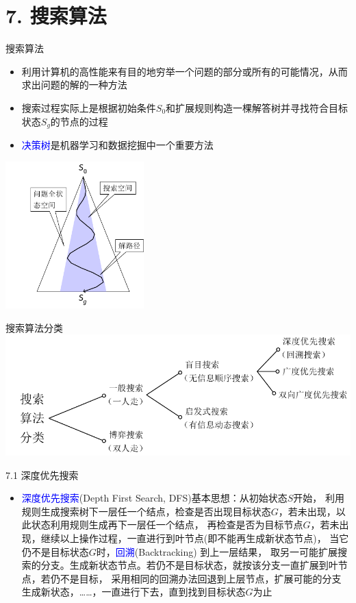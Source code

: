 


\frame{\titlepage}
\section{7. 搜索算法}
\begin{frame}{搜索算法}
    \begin{itemize}
        \item 利用计算机的高性能来有目的地穷举一个问题的部分或所有的可能情况，从而求出问题的解的一种方法
        \item 搜索过程实际上是根据初始条件$S_0$和扩展规则构造一棵解答树并寻找符合目标状态$S_g$的节点的过程
        \item \textcolor{blue}{决策树}是机器学习和数据挖掘中一个重要方法
    \end{itemize}
    \includegraphics[width=0.4\textwidth,center]{fig/7-1.pdf}
\end{frame}
\begin{frame}{搜索算法分类}
    \includegraphics[width=\textwidth]{fig/7-2.pdf}
\end{frame}
\begin{frame}{7.1 深度优先搜索}
    \begin{itemize}
        \item \textcolor{blue}{深度优先搜索}(Depth First Search, DFS)基本思想：从初始状态$S$开始，
        利用规则生成搜索树下一层任一个结点，检查是否出现目标状态$G$，若未出现，以此状态利用规则生成再下一层任一个结点，
        再检查是否为目标节点$G$，若未出现，继续以上操作过程，一直进行到叶节点(即不能再生成新状态节点)，
        当它仍不是目标状态$G$时，\textcolor{blue}{回溯}(Backtracking) 到上一层结果，
        取另一可能扩展搜索的分支。生成新状态节点。若仍不是目标状态，就按该分支一直扩展到叶节点，若仍不是目标，
        采用相同的回溯办法回退到上层节点，扩展可能的分支生成新状态，……，一直进行下去，直到找到目标状态$G$为止
    \end{itemize}
\end{frame}

